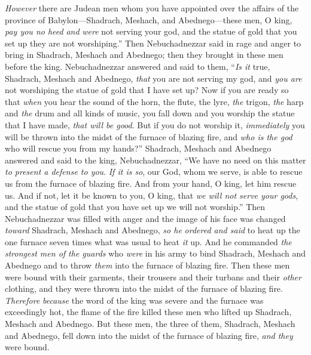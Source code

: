 \begin{biblechapter}
\verse \textit{However} there are Judean men whom you have appointed over the affairs of the province of Babylon—Shadrach, Meshach, and Abednego—these men, O king, \textit{pay you no heed} \textit{and} \textit{were} not serving your god, and the statue of gold that you set up they are not worshiping.”
\verse Then Nebuchadnezzar said in rage and anger to bring in Shadrach, Meshach and Abednego; then they brought in these men before the king.
\verse Nebuchadnezzar answered and said to them, “\textit{Is it} true, Shadrach, Meshach and Abednego, \textit{that} you are not serving my god, and \textit{you are} not worshiping the statue of gold that I have set up?
\verse Now if you are ready so that \textit{when} you hear the sound of the horn, the flute, the lyre, \textit{the} trigon, \textit{the} harp and \textit{the} drum and all kinds of music, you fall down and you worship the statue that I have made, \textit{that will be good}. But if you do not worship it, \textit{immediately} you will be thrown into the midst of the furnace of blazing fire, and \textit{who is the god} who will rescue you from my hands?”
\verse Shadrach, Meshach and Abednego answered and said to the king, Nebuchadnezzar, “We have no need on this matter \textit{to present a defense to you}.
\verse \textit{If it is so}, our God, whom we serve, is able to rescue us from the furnace of blazing fire. And from your hand, O king, let him rescue us.
\verse And if not, let it be known to you, O king, that \textit{we will not serve your gods}, and the statue of gold that you have set up we will not worship.”
 Then Nebuchadnezzar was filled with anger and the image of his face was changed \textit{toward} Shadrach, Meshach and Abednego, \textit{so he} \textit{ordered and said} to heat up the one furnace seven times what was usual to heat \textit{it} up.
\verse And he commanded \textit{the strongest men of the guards} who \textit{were} in his army to bind Shadrach, Meshach and Abednego and to throw \textit{them} into the furnace of blazing fire.
\verse Then these men were bound with their garments, their trousers and their turbans and their \textit{other} clothing, and they were thrown into the midst of the furnace of blazing fire.
\verse \textit{Therefore} \textit{because} the word of the king was severe and the furnace was exceedingly hot, the flame of the fire killed these men who lifted up Shadrach, Meshach and Abednego.
\verse But these men, the three of them, Shadrach, Meshach and Abednego, fell down into the midst of the furnace of blazing fire, \textit{and they} were bound.

\end{biblechapter}
